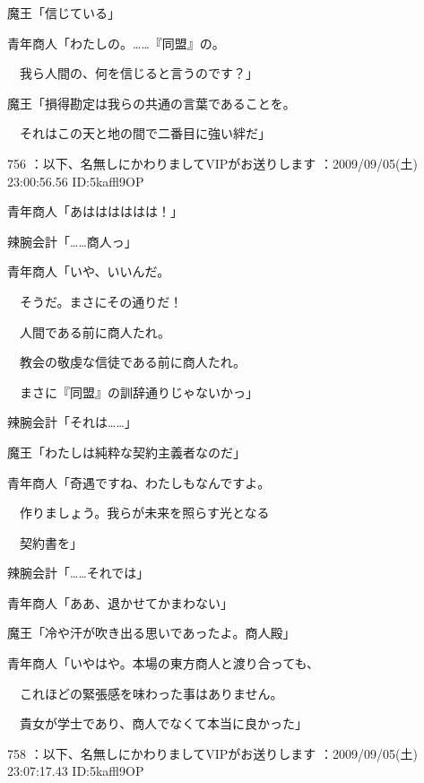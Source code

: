 \documentclass[a4j,twocolumn]{tarticle}
\begin{document}
魔王「信じている」 



青年商人「わたしの。……『同盟』の。\par{} 
　我ら人間の、何を信じると言うのです？」 



魔王「損得勘定は我らの共通の言葉であることを。\par{} 
　それはこの天と地の間で二番目に強い絆だ」 

	
    
    

756 ：以下、名無しにかわりましてVIPがお送りします ：2009/09/05(土) 23:00:56.56 ID:5kaffl9OP 


青年商人「あはははははは！」\par{} 
辣腕会計「……商人っ」 



青年商人「いや、いいんだ。\par{} 
　そうだ。まさにその通りだ！\par{} 
　人間である前に商人たれ。\par{} 
　教会の敬虔な信徒である前に商人たれ。\par{} 
　まさに『同盟』の訓辞通りじゃないかっ」 



辣腕会計「それは……」 



魔王「わたしは純粋な契約主義者なのだ」 



青年商人「奇遇ですね、わたしもなんですよ。\par{} 
　作りましょう。我らが未来を照らす光となる\par{} 
　契約書を」 



辣腕会計「……それでは」\par{} 
青年商人「ああ、退かせてかまわない」 



魔王「冷や汗が吹き出る思いであったよ。商人殿」 



青年商人「いやはや。本場の東方商人と渡り合っても、\par{} 
　これほどの緊張感を味わった事はありません。\par{} 
　貴女が学士であり、商人でなくて本当に良かった」 

	
    
    

758 ：以下、名無しにかわりましてVIPがお送りします ：2009/09/05(土) 23:07:17.43 ID:5kaffl9OP 
\end{document}
